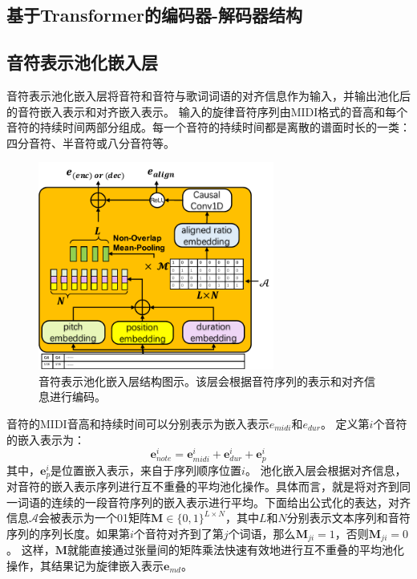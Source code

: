 \subsection{基于Transformer的编码器-解码器结构}
\label{sec:transformer_enc_dec}
\subsection{音符表示池化嵌入层}
\label{sec:note_pooling}
音符表示池化嵌入层将音符和音符与歌词词语的对齐信息作为输入，并输出池化后的音符嵌入表示和对齐嵌入表示。
输入的旋律音符序列由MIDI格式的音高和每个音符的持续时间两部分组成。每一个音符的持续时间都是离散的谱面时长的一类：四分音符、半音符或八分音符等。
\begin{figure}[t]
    \centering
    \label{fig:align_enc}
    \includegraphics[width=0.69\textwidth,clip=true]{figure/ast/note-pooling.pdf}
    \caption{音符表示池化嵌入层结构图示。该层会根据音符序列的表示和对齐信息进行编码。}
\end{figure}
音符的MIDI音高和持续时间可以分别表示为嵌入表示$e_{midi}$和$e_{dur}$。
定义第$i$个音符的嵌入表示为：
\begin{equation}
\label{eq:note}
    \mathbf{e}_{note}^i=\mathbf{e}_{midi}^i+\mathbf{e}_{dur}^i+\mathbf{e}_p^i
\end{equation}
其中，$\mathbf{e}_p^i$是位置嵌入表示，来自于序列顺序位置$i$。
池化嵌入层会根据对齐信息，对音符的嵌入表示序列进行互不重叠的平均池化操作。具体而言，就是将对齐到同一词语的连续的一段音符序列的嵌入表示进行平均。下面给出公式化的表达，对齐信息$\mathcal{A}$会被表示为一个01矩阵$\mathbf{M} \in \{0,1\}^{L \times N}$，其中$L$和$N$分别表示文本序列和音符序列的序列长度。如果第$i$个音符对齐到了第$j$个词语，那么$\mathbf{M}_{ji}=1$，否则$\mathbf{M}_{ji}=0$。
这样，$\mathbf{M}$就能直接通过张量间的矩阵乘法快速有效地进行互不重叠的平均池化操作，其结果记为旋律嵌入表示$\mathbf{e}_{md}$。
